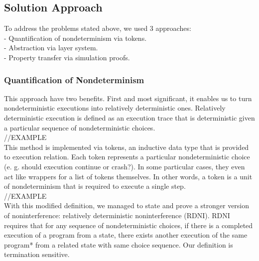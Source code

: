 \documentclass[onecolumn]{paper}
\begin{document}

\subsection*{Solution Approach}
To address the problems stated above, we used 3 approaches:\\
- Quantification of nondeterminism via tokens.\\
- Abstraction via layer system.\\
- Property transfer via simulation proofs.


\subsubsection*{Quantification of Nondeterminism}


This approach have two benefits. First and most significant, it enables us to
turn nondeterministic executions into relatively deterministic ones. 
Relatively deterministic execution is defined as an execution trace that is deterministic given a particular sequence of nondeterministic choices.\\

//EXAMPLE\\


This method is implemented via tokens, an inductive data type that is provided to execution relation. Each token represents a particular nondeterministic choice (e. g. should execution continue or crash?). In some particular cases, they even act like wrappers for a list of tokens themselves. In other words, a token is a unit of nondeterminism that is required to execute a single step.\\

//EXAMPLE\\

With this modified definition, we managed to state and prove a stronger version of noninterference: relatively deterministic noninterference (RDNI). RDNI requires that for any sequence of nondeterministic choices, if there is a completed execution of a program from a state, there exists another execution of the same program* from a related state with same choice sequence. Our definition is termination sensitive.
\end{document}

